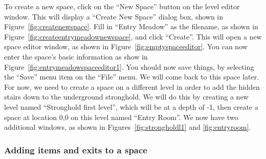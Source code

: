 To create a new space, click on the ``New Space'' button on the level
editor window.  This will display a ``Create New Space'' dialog box,
shown in Figure~\ref{fig:createnewspace}.  Fill in ``Entry Meadow'' as
the filename, as shown in Figure~\ref{fig:createentrymeadownewspace},
and click ``Create''.  This will open a new space editor window, as
shown in Figure~\ref{fig:emptyspaceeditor}.  You can now enter the
space's basic information as show in
Figure~\ref{fig:entrymeadowspaceeditor1}.  You should now save things,
by selecting the ``Save'' menu item on the ``File'' menu.  We will come
back to this space later.  For now, we need to create a space on a
different level in order to add the hidden stairs down to the
underground stronghold.  We will do this by creating a new level named
``Stronghold first level'', which will be at a depth of -1, then create
a space at location 0,0 on this level named ``Entry Room''. We now have
two additional windows, as shown in Figures~\ref{fig:strongholdl1} and
\ref{fig:entryroom}.

\subsubsection{Adding items and exits to a space}

